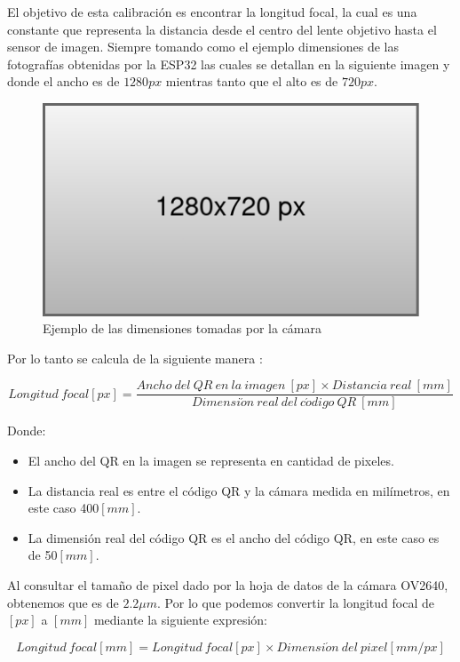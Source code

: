 El objetivo de esta calibración es encontrar la longitud focal, la cual es una constante que representa la distancia desde el centro del lente objetivo hasta el sensor de imagen. Siempre tomando como el ejemplo dimensiones de las fotografías obtenidas por la ESP32 las cuales se detallan en la siguiente imagen y donde el ancho es de $1280px$ mientras tanto que el alto es de $720px$.

\begin{figure}[H]
   \centering
   \includegraphics[width=0.5\linewidth]{images/ejemplo_foto.drawio.png}
   \caption{Ejemplo de las dimensiones tomadas por la cámara}
   \label{fig:qr}
\end{figure}

Por lo tanto se calcula de la siguiente manera \cite{wu2018size}:

\begin{equation}
   Longitud\ focal [px] = \frac{Ancho\ del\ QR\ en\ la\ imagen\ [px] \times Distancia\ real\ [mm]}{Dimensi\acute{o}n\ real\ del\ c\acute{o}digo\ QR\ [mm]}
   \label{ec:logitud_focal}
\end{equation}

Donde:
\begin{itemize}
   \item El ancho del QR en la imagen se representa en cantidad de pixeles.
   \item La distancia real es entre el código QR y la cámara medida en milímetros, en este caso 400$[mm]$.
   \item La dimensión real del código QR es el ancho del código QR, en este caso es de 50$[mm]$.
\end{itemize}

Al consultar el tamaño de pixel dado por la hoja de datos de la cámara OV2640, obtenemos que es de $2.2\mu m$. Por lo que podemos convertir la longitud focal de $[px]$ a $[mm]$ mediante la siguiente expresión:

\begin{equation}
 Longitud\ focal [mm] = Longitud\ focal [px] \times Dimensi\acute{o}n\ del\ pixel [mm/px]
\end{equation}

